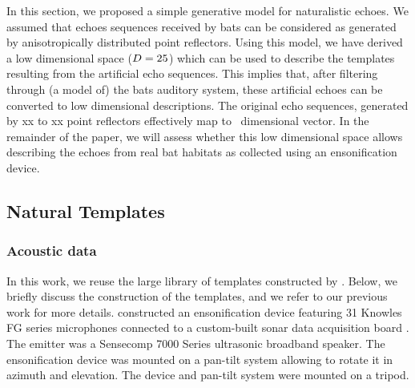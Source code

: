 \documentclass[preprint,5p]{elsarticle}
\begin{document}



In this section, we proposed a simple generative model for naturalistic echoes. We assumed that echoes sequences received by bats can be considered as generated by anisotropically distributed point reflectors. Using this model, we have derived a low dimensional space ($D = 25$) which can be used to describe the templates resulting from the artificial echo sequences. This implies that, after filtering through (a model of) the bats auditory system, these artificial echoes can be converted to low dimensional descriptions. The original echo sequences, generated by xx to xx point reflectors effectively map to \pca\ dimensional vector. In the remainder of the paper, we will assess whether this low dimensional space allows describing the echoes from real bat habitats as collected using an ensonification device.

\subsection{Natural Templates}

\subsubsection{Acoustic data}

In this work, we reuse the large library of templates constructed by \citet{Vanderelst2016}. Below, we briefly discuss the construction of the templates, and we refer to our previous work for more details. \citet{Vanderelst2016} constructed an ensonification device featuring 31 Knowles FG series microphones connected to a custom-built sonar data acquisition board \citep{Steckel2013a}. The emitter was a Sensecomp 7000 Series ultrasonic broadband speaker. The ensonification device was mounted on a pan-tilt system allowing to rotate it in azimuth and elevation. The device and pan-tilt system were mounted on a tripod.
\end{document}
